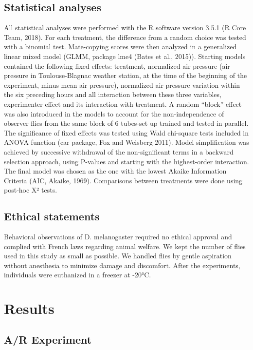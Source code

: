 \documentclass[a4paper, 12pt]{article}
\begin{document}
	\subsection{Statistical analyses}

	All statistical analyses were performed with the R software version 3.5.1 (R Core Team, 2018).
	For each treatment, the difference from a random choice was tested with a binomial test. Mate-copying scores were then analyzed in a generalized linear mixed model (GLMM, package lme4 (Bates et al., 2015)). Starting models contained the following fixed effects: treatment, normalized air pressure (air pressure in Toulouse-Blagnac weather station, at the time of the beginning of the experiment, minus mean air pressure), normalized air pressure variation within the six preceding hours and all interaction between these three variables, experimenter effect and its interaction with treatment. A random “block” effect was also introduced in the models to account for the non-independence of observer flies from the same block of 6 tubes-set up trained and tested in parallel. The significance of fixed effects was tested using Wald chi-square tests included in ANOVA function (car package, Fox and Weisberg 2011). Model simplification was achieved by successive withdrawal of the non-significant terms in a backward selection approach, using P-values and starting with the highest-order interaction. The final model was chosen as the one with the lowest Akaike Information Criteria (AIC, Akaike, 1969). Comparisons between treatments were done using post-hoc X² tests. 

	\subsection{Ethical statements}

	Behavioral observations of D. melanogaster required no ethical approval and complied with French laws regarding animal welfare. We kept the number of flies used in this study as small as possible. We handled flies by gentle aspiration without anesthesia to minimize damage and discomfort. After the experiments, individuals were euthanized in a freezer at -20°C.

	\section{Results}

	\subsection{A/R Experiment}
	\label{subsec:AR-experiment}
\end{document}
